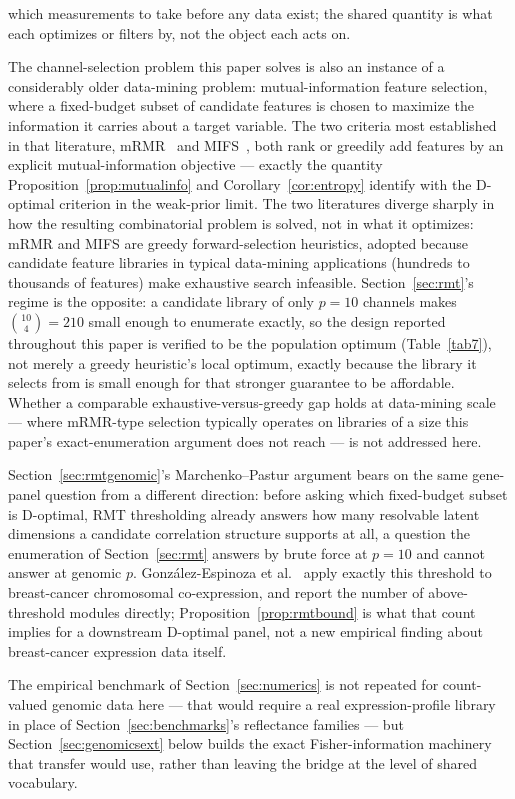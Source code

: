 \documentclass[11pt]{article}
\begin{document}
which measurements to take before any data exist; the shared quantity is what each optimizes or filters by, not the object each acts on.

The channel-selection problem this paper solves is also an instance of a considerably older data-mining problem: mutual-information feature selection, where a fixed-budget subset of candidate features is chosen to maximize the information it carries about a target variable. The two criteria most established in that literature, mRMR~\citep{ref41} and MIFS~\citep{ref42}, both rank or greedily add features by an explicit mutual-information objective --- exactly the quantity Proposition~\ref{prop:mutualinfo} and Corollary~\ref{cor:entropy} identify with the D-optimal criterion in the weak-prior limit. The two literatures diverge sharply in how the resulting combinatorial problem is solved, not in what it optimizes: mRMR and MIFS are greedy forward-selection heuristics, adopted because candidate feature libraries in typical data-mining applications (hundreds to thousands of features) make exhaustive search infeasible. Section~\ref{sec:rmt}'s regime is the opposite: a candidate library of only $p=10$ channels makes $\binom{10}{4}=210$ small enough to enumerate exactly, so the design reported throughout this paper is verified to be the population optimum (Table~\ref{tab7}), not merely a greedy heuristic's local optimum, exactly because the library it selects from is small enough for that stronger guarantee to be affordable. Whether a comparable exhaustive-versus-greedy gap holds at data-mining scale --- where mRMR-type selection typically operates on libraries of a size this paper's exact-enumeration argument does not reach --- is not addressed here.

Section~\ref{sec:rmtgenomic}'s Marchenko--Pastur argument bears on the same gene-panel question from a different direction: before asking which fixed-budget subset is D-optimal, RMT thresholding already answers how many resolvable latent dimensions a candidate correlation structure supports at all, a question the enumeration of Section~\ref{sec:rmt} answers by brute force at $p=10$ and cannot answer at genomic $p$. Gonz\'{a}lez-Espinoza et al.~\citep{ref46} apply exactly this threshold to breast-cancer chromosomal co-expression, and report the number of above-threshold modules directly; Proposition~\ref{prop:rmtbound} is what that count implies for a downstream D-optimal panel, not a new empirical finding about breast-cancer expression data itself.

The empirical benchmark of Section~\ref{sec:numerics} is not repeated for count-valued genomic data here --- that would require a real expression-profile library in place of Section~\ref{sec:benchmarks}'s reflectance families --- but Section~\ref{sec:genomicsext} below builds the exact Fisher-information machinery that transfer would use, rather than leaving the bridge at the level of shared vocabulary.
\end{document}
